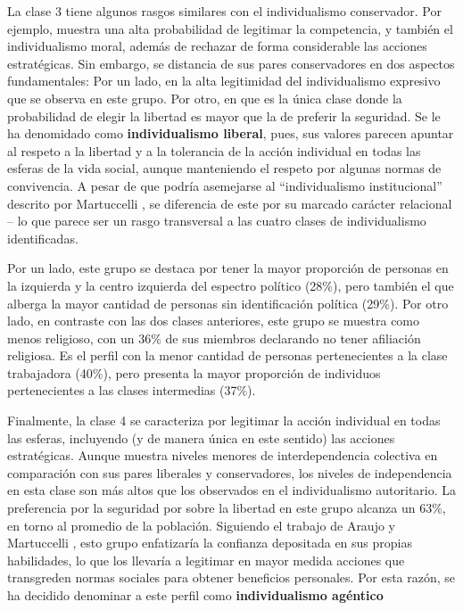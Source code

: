 \documentclass[12pt,twoside]{templates/facsothesis}
\begin{document}
La clase 3 tiene algunos rasgos similares con el individualismo conservador. Por ejemplo, muestra una alta probabilidad de legitimar la competencia, y también el individualismo moral, además de rechazar de forma considerable las acciones estratégicas. Sin embargo, se distancia de sus pares conservadores en dos aspectos fundamentales: Por un lado, en la alta legitimidad del individualismo expresivo que se observa en este grupo. Por otro, en que es la única clase donde la probabilidad de elegir la libertad es mayor que la de preferir la seguridad. Se le ha denomidado como \textbf{individualismo liberal}, pues, sus valores parecen apuntar al respeto a la libertad y a la tolerancia de la acción individual en todas las esferas de la vida social, aunque manteniendo el respeto por algunas normas de convivencia. A pesar de que podría asemejarse al ``individualismo institucional'' descrito por Martuccelli \citeyearpar{martuccelli2010}, se diferencia de este por su marcado carácter relacional -- lo que parece ser un rasgo transversal a las cuatro clases de individualismo identificadas.

Por un lado, este grupo se destaca por tener la mayor proporción de personas en la izquierda y la centro izquierda del espectro político (28\%), pero también el que alberga la mayor cantidad de personas sin identificación política (29\%). Por otro lado, en contraste con las dos clases anteriores, este grupo se muestra como menos religioso, con un 36\% de sus miembros declarando no tener afiliación religiosa. Es el perfil con la menor cantidad de personas pertenecientes a la clase trabajadora (40\%), pero presenta la mayor proporción de individuos pertenecientes a las clases intermedias (37\%).

Finalmente, la clase 4 se caracteriza por legitimar la acción individual en todas las esferas, incluyendo (y de manera única en este sentido) las acciones estratégicas. Aunque muestra niveles menores de interdependencia colectiva en comparación con sus pares liberales y conservadores, los niveles de independencia en esta clase son más altos que los observados en el individualismo autoritario. La preferencia por la seguridad por sobre la libertad en este grupo alcanza un 63\%, en torno al promedio de la población. Siguiendo el trabajo de Araujo y Martuccelli \citeyearpar{araujo2012}, esto grupo enfatizaría la confianza depositada en sus propias habilidades, lo que los llevaría a legitimar en mayor medida acciones que transgreden normas sociales para obtener beneficios personales. Por esta razón, se ha decidido denominar a este perfil como \textbf{individualismo agéntico}
\end{document}
